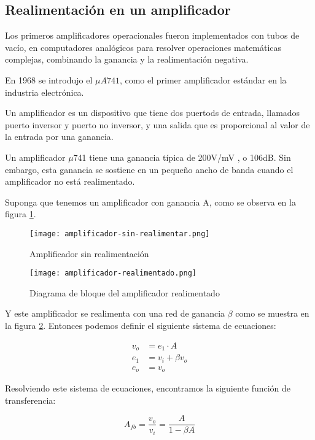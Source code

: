 \subsection{Realimentación en un amplificador}
Los primeros amplificadores operacionales fueron implementados con tubos de vacío, en computadores analógicos para resolver operaciones matemáticas complejas, combinando la ganancia y la realimentación negativa.

En 1968 se introdujo el $\mu A741$, como el primer amplificador estándar en la industria electrónica.

Un amplificador es un dispositivo que tiene dos puertods de entrada, llamados puerto inversor y puerto no inversor, y una salida que es proporcional
al valor de la entrada por una ganancia.

Un amplificador $\mu$741 tiene una ganancia típica de 200V/mV , o 106dB. Sin embargo, esta ganancia se sostiene en un pequeño ancho de banda cuando el amplificador no está realimentado.

Suponga que tenemos un amplificador con ganancia A, como se observa
en la figura \ref{fig:mt-amplificador-sin-realimentar}.

\begin{figure}[ht]
    \centering
    \texttt{[image: amplificador-sin-realimentar.png]}
    \caption{Amplificador sin realimentación}
    \label{fig:mt-amplificador-sin-realimentar}
\end{figure}

\begin{figure}[ht]
    \centering
    \texttt{[image: amplificador-realimentado.png]}
    \caption{Diagrama de bloque del amplificador realimentado}
    \label{fig:mt-amplificador-realimentado}
\end{figure}

Y este amplificador se realimenta con una red de ganancia $\beta$ como se muestra en la figura \ref{fig:mt-amplificador-realimentado}. Entonces podemos definir el siguiente sistema de ecuaciones:

\begin{align*}
    v_o & = e_1 \cdot A \\
    e_1 & = v_i + \beta v_o \\
    e_o & = v_o
\end{align*}

Resolviendo este sistema de ecuaciones, encontramos la siguiente función de transferencia:

\begin{equation}
    \boxed{A_{fb} = \frac{v_o}{v_i} = \frac{A}{1 - \beta A}}
    \label{eq:mt-func-transferencia-realimentacion}
\end{equation}

